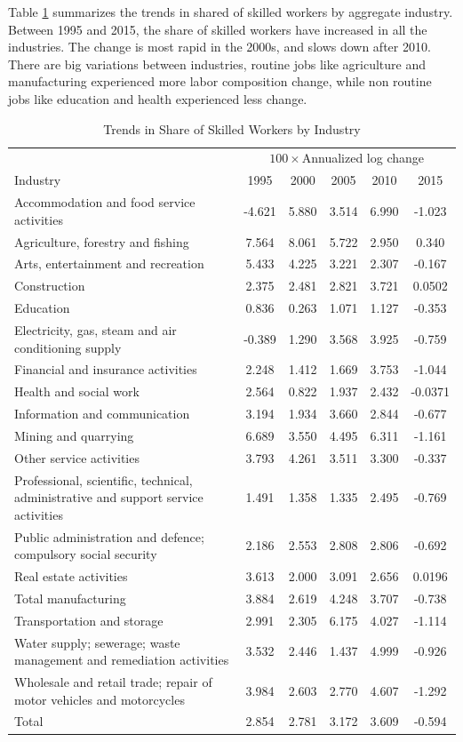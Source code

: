 \documentclass[12pt]{article}
\begin{document}
Table \ref{Industry_trend} summarizes the trends in shared of skilled workers by aggregate industry. Between 1995 and 2015, the share of skilled workers have increased in all the industries. The change is most rapid in the 2000s, and slows down after 2010. There are big variations between industries, routine jobs like agriculture and manufacturing experienced more labor composition change, while non routine jobs like education and health experienced less change. 
\begin{table}[h!]
\center
\scriptsize
\caption{Trends in Share of Skilled Workers by Industry}
\label{Industry_trend}
\begin{tabular}{l|ccccc} 
\hline \hline
& \multicolumn{5}{c}{$100 \times$Annualized log change} \\
Industry & 1995 & 2000 & 2005 & 2010 & 2015 \\ \hline
Accommodation and food service activities & -4.621 & 5.880 & 3.514 & 6.990 & -1.023 \\
Agriculture, forestry and fishing & 7.564 & 8.061 & 5.722 & 2.950 & 0.340 \\
Arts, entertainment and recreation & 5.433 & 4.225 & 3.221 & 2.307 & -0.167 \\
Construction & 2.375 & 2.481 & 2.821 & 3.721 & 0.0502 \\
Education & 0.836 & 0.263 & 1.071 & 1.127 & -0.353 \\
Electricity, gas, steam and air conditioning supply & -0.389 & 1.290 & 3.568 & 3.925 & -0.759 \\
Financial and insurance activities & 2.248 & 1.412 & 1.669 & 3.753 & -1.044 \\
Health and social work & 2.564 & 0.822 & 1.937 & 2.432 & -0.0371 \\
Information and communication & 3.194 & 1.934 & 3.660 & 2.844 & -0.677 \\
Mining and quarrying & 6.689 & 3.550 & 4.495 & 6.311 & -1.161 \\
Other service activities & 3.793 & 4.261 & 3.511 & 3.300 & -0.337 \\
Professional, scientific, technical, administrative and support service activities & 1.491 & 1.358 & 1.335 & 2.495 & -0.769 \\
Public administration and defence; compulsory social security & 2.186 & 2.553 & 2.808 & 2.806 & -0.692 \\
Real estate activities & 3.613 & 2.000 & 3.091 & 2.656 & 0.0196 \\
Total manufacturing & 3.884 & 2.619 & 4.248 & 3.707 & -0.738 \\
Transportation and storage & 2.991 & 2.305 & 6.175 & 4.027 & -1.114 \\
Water supply; sewerage; waste management and remediation activities & 3.532 & 2.446 & 1.437 & 4.999 & -0.926 \\
Wholesale and retail trade; repair of motor vehicles and motorcycles & 3.984 & 2.603 & 2.770 & 4.607 & -1.292 \\ 
Total & 2.854  & 2.781 & 3.172  & 3.609 & -0.594 \\ \hline
\end{tabular}
\end{table}
\end{document}

